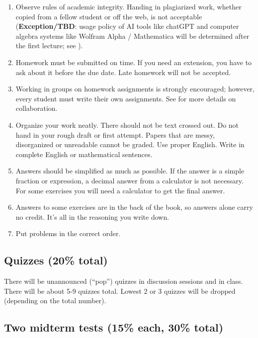 \documentclass[oneside,11pt]{amsart}
\begin{document}
\begin{enumerate}[$\bullet$]
	\item Observe rules of academic integrity.
		Handing in plagiarized work, whether copied from a fellow student or off the web, is not acceptable (\textbf{Exception/TBD}: usage policy of AI tools like chatGPT and computer algebra systems like Wolfram Alpha / Mathematica will be determined after the first lecture; see ).
    
	\item Homework must be submitted on time. If you need an extension, you have to ask about it before the due date. Late homework will not be accepted.
    
    \item Working in groups on homework assignments is strongly encouraged; however, every student must write their own assignments. See  for more details on collaboration.
    
    \item Organize your work neatly. 
There should not be text crossed out.
Do not hand in your rough draft or first attempt.
Papers that are messy, disorganized or unreadable cannot be graded. Use proper English. Write in complete English or mathematical sentences.
    \item Answers should be simplified as much as possible. If the answer is a simple fraction or expression, a decimal answer from a calculator is not necessary. For some exercises you will need a calculator to get the final answer.
    
    \item Answers to some exercises are in the back of the book, so answers alone carry no credit. It's all in the reasoning you write down.
    
    \item Put problems in the correct order.
\end{enumerate}

\subsection{Quizzes (20\% total)}
 There will be unannounced (``pop'') quizzes in discussion sessions and in class. There will be about 5-9 quizzes total. Lowest 2 or 3 quizzes will be dropped (depending on the total number).


\subsection{Two midterm tests (15\% each, 30\% total)}
\end{document}
